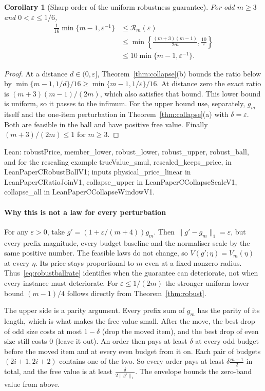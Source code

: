 \documentclass[conference]{IEEEtran}
\newtheorem{corollary}[theorem]{Corollary}
\theoremstyle{definition}
\newcommand{\lean}[1]{\textsf{\footnotesize #1}}
\newcommand{\leanbox}[1]{%
  \par\vspace{2pt}\noindent
  {\raggedright\footnotesize\textsf{Lean: #1}\par}\vspace{2pt}}
\begin{document}
\begin{corollary}[Sharp order of the uniform robustness guarantee]
\label{cor:robustball}
For odd $m\ge3$ and $0<\varepsilon\le1/6$,
\begin{align}
\frac1{16}\min\{m-1,\varepsilon^{-1}\}
&\le \mathcal R_m(\varepsilon)\nonumber\\
&\le\min\left\{\frac{(m+3)(m-1)}{2m},\frac{10}{\varepsilon}\right\}\nonumber\\
&\le10\min\{m-1,\varepsilon^{-1}\}.
\label{eq:robustballrate}
\end{align}
\end{corollary}
\begin{proof}
At a distance $d\in(0,\varepsilon]$, Theorem~\ref{thm:collapse}(b) bounds the ratio below by
$\min\{m-1,1/d\}/16\ge\min\{m-1,1/\varepsilon\}/16$.
At distance zero the exact ratio is $(m+3)(m-1)/(2m)$, which also satisfies that bound.
This lower bound is uniform, so it passes to the infimum.
For the upper bound use, separately, $g_m$ itself and the one-item perturbation in
Theorem~\ref{thm:collapse}(a) with $\delta=\varepsilon$. Both are feasible in the ball and
have positive free value. Finally $(m+3)/(2m)\le1$ for $m\ge3$.
\end{proof}
\leanbox{\lean{robustPrice}, \lean{member\_lower}, \lean{robust\_lower}, \lean{robust\_upper},
\lean{robust\_ball}, and for the rescaling example \lean{trueValue\_smul},
\lean{rescaled\_keeps\_price}, in \lean{LeanPaperCRobustBallV1}; inputs
\lean{physical\_price\_linear} in \lean{LeanPaperCRatioJoinV1}, \lean{collapse\_upper} in
\lean{LeanPaperCCollapseScaleV1}, \lean{collapse\_all} in \lean{LeanPaperCCollapseWindowV1}.}

\paragraph{Why this is not a law for every perturbation}
For any $\varepsilon>0$, take $g'=(1+\varepsilon/(m+4))g_m$.
Then $\|g'-g_m\|_1=\varepsilon$, but every prefix magnitude, every budget baseline and the
normaliser scale by the same positive number. The feasible laws do not change, so
$V(g';\eta)=V_m(\eta)$ at every $\eta$. Its price stays proportional to $m$ even at a fixed
nonzero radius. Thus~\eqref{eq:robustballrate} identifies when the guarantee can deteriorate,
not when every instance must deteriorate. For $\varepsilon\le1/(2m)$ the stronger uniform
lower bound $(m-1)/4$ follows directly from Theorem~\ref{thm:robust}.

The upper side is a parity argument. Every prefix sum of $g_{m}$ has the parity of its
length, which is what makes the free value small. After the move, the best drop of odd size
costs at most $1-\delta$ (drop the moved item), and the best drop of even size still costs
$0$ (leave it out). An order then pays at least $\delta$ at every odd budget before the moved
item and at every even budget from it on. Each pair of budgets $(2i+1,2i+2)$ contains one of
the two. So every order pays at least $\delta\frac{m-1}{2}$ in total, and the free value is at
least $\frac{\delta}{2\|g'\|_{1}}$. The envelope bounds the zero-band value from above.
\end{document}
